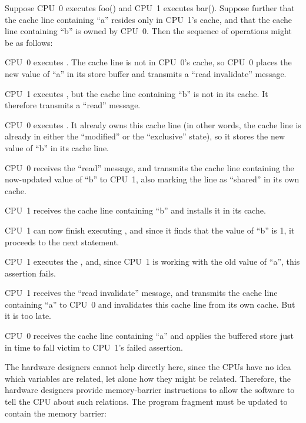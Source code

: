 Suppose CPU~0 executes foo() and CPU~1 executes bar().
Suppose further that the cache line containing ``a'' resides only in CPU~1's
cache, and that the cache line containing ``b'' is owned by CPU~0.
Then the sequence of operations might be as follows:
\begin{sequence}
\item	CPU~0 executes .  The cache line is not in
	CPU~0's cache, so CPU~0 places the new value of ``a'' in its
	store buffer and transmits a ``read invalidate'' message.
	\label{seq:app:whymb:Store Buffers and Memory Barriers}
\item	CPU~1 executes , but the cache line
	containing ``b'' is not in its cache.
	It therefore transmits a ``read'' message.
\item	CPU~0 executes .
	It already owns this cache line (in other words, the cache line
	is already in either the ``modified'' or the ``exclusive'' state),
	so it stores the new value of ``b'' in its cache line.
\item	CPU~0 receives the ``read'' message, and transmits the
	cache line containing the now-updated value of ``b''
	to CPU~1, also marking the line as ``shared'' in its own cache.
\item	CPU~1 receives the cache line containing ``b'' and installs
	it in its cache.
\item	CPU~1 can now finish executing ,
	and since it finds that the value of ``b'' is 1, it proceeds
	to the next statement.
\item	CPU~1 executes the , and, since CPU~1 is
	working with the old value of ``a'', this assertion fails.
\item	CPU~1 receives the ``read invalidate'' message, and
	transmits the cache line containing ``a'' to CPU~0 and
	invalidates this cache line from its own cache.
	But it is too late.
\item	CPU~0 receives the cache line containing ``a'' and applies
	the buffered store just in time to fall victim to CPU~1's
	failed assertion.
\end{sequence}

\QuickQuizEnd

The hardware designers cannot help directly here, since the CPUs have
no idea which variables are related, let alone how they might be related.
Therefore, the hardware designers provide memory-barrier instructions
to allow the software to tell the CPU about such relations.
The program fragment must be updated to contain the memory barrier:

